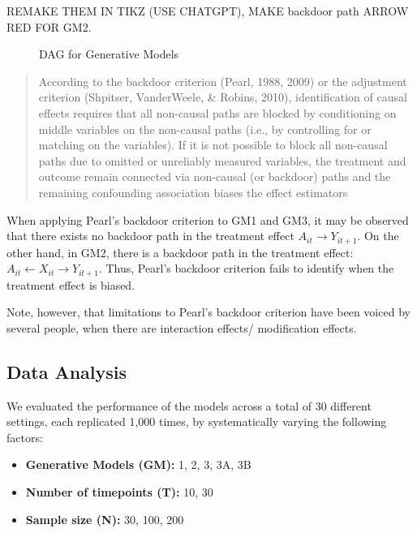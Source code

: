 \documentclass[
  12pt,
  a4paper,
]{article}
\begin{document}
REMAKE THEM IN TIKZ (USE CHATGPT), MAKE backdoor path ARROW RED FOR GM2.

\begin{figure}[H]

\begin{minipage}{0.50\linewidth}
DAG for Generative Models\end{minipage}%

\end{figure}%

\begin{quote}
According to the backdoor criterion (Pearl, 1988, 2009) or the
adjustment criterion (Shpitser, VanderWeele, \& Robins, 2010),
identification of causal effects requires that all non-causal paths are
blocked by conditioning on middle variables on the non-causal paths
(i.e., by controlling for or matching on the variables). If it is not
possible to block all non-causal paths due to omitted or unreliably
measured variables, the treatment and outcome remain connected via
non-causal (or backdoor) paths and the remaining confounding association
biases the effect estimators
\end{quote}

When applying Pearl's backdoor criterion to GM1 and GM3, it may be
observed that there exists no backdoor path in the treatment effect
\(A_{it} \to Y_{it+1}\). On the other hand, in GM2, there is a backdoor
path in the treatment effect:
\(A_{it} \leftarrow X_{it} \rightarrow Y_{it+1}\). Thus, Pearl's
backdoor criterion fails to identify when the treatment effect is
biased.

Note, however, that limitations to Pearl's backdoor criterion have been
voiced by several people, when there are interaction effects/
modification effects.

\subsection{Data Analysis}\label{data-analysis}

We evaluated the performance of the models across a total of 30
different settings, each replicated 1,000 times, by systematically
varying the following factors:

\begin{itemize}
\item
  \textbf{Generative Models (GM):} 1, 2, 3, 3A, 3B
\item
  \textbf{Number of timepoints (T):} 10, 30
\item
  \textbf{Sample size (N):} 30, 100, 200
\end{itemize}
\end{document}
